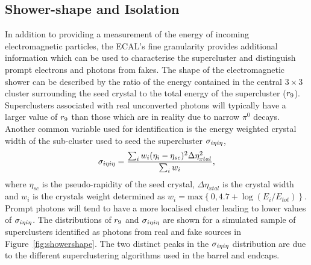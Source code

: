 \subsection{Shower-shape and Isolation}
In addition to providing a measurement of the energy of incoming electromagnetic particles,
the ECAL's fine granularity provides additional information which can be used to characterise
the supercluster and distinguish prompt electrons and photons from fakes.  
The shape of the electromagnetic shower can be described by the ratio of the energy contained
in the central $3\times3$ cluster surrounding the seed crystal to the total energy of the supercluster
($r_{9}$). Superclusters associated with real unconverted photons will typically have a larger value of 
$r_{9}$ than those which are in reality due to narrow $\pi^{0}$ decays. Another common variable used
for identification is the energy weighted crystal width of the sub-cluster used to seed the supercluster  
$\sigma_{i\eta i\eta}$, 
\begin{equation}
\sigma_{i\eta i\eta} = \frac{\sum_{i}w_{i}(\eta_{i}-\eta_{sc})^{2}\Delta\eta^{2}_{xtal}}{\sum_{i}w_{i}},
\end{equation}
where $\eta_{sc}$ is the pseudo-rapidity of the seed crystal, $\Delta\eta_{xtal}$ is the crystal width
and $w_{i}$ is the crystals weight determined as $w_{i} = \mathrm{max}\left\{0,4.7+\log(E_{i}/E_{tot})\right\}$.
Prompt photons will tend to have a more localised cluster leading to lower values of $\sigma_{i\eta i\eta}$. 
The distributions of $r_{9}$ and $\sigma_{i\eta i\eta}$ are shown for a simulated sample of 
superclusters identified as photons from real and fake sources in Figure~\ref{fig:showershape}.
The two distinct peaks in the $\sigma_{i\eta i\eta}$ distribution are due to the different superclustering algorithms 
used in the barrel and endcaps.

